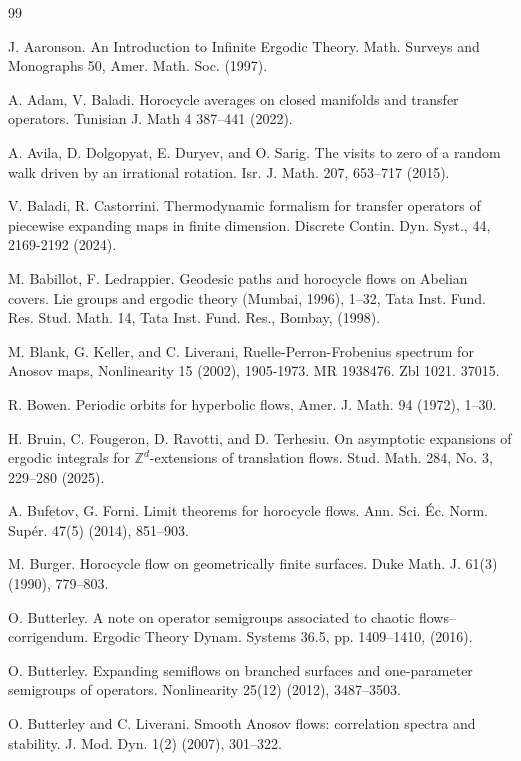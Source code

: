 \documentclass[11pt,letterpaper]{amsart}
\newcommand \Z {{ \mathbb Z}}
\theoremstyle{definition}
\begin{document}


\begin{thebibliography}{99}

 J. Aaronson. An Introduction to Infinite Ergodic Theory. Math. Surveys and Monographs 50,
Amer. Math. Soc. (1997).

 A. Adam, V. Baladi. Horocycle averages on closed manifolds and transfer operators. Tunisian J. Math 4 387--441 (2022).

 A. Avila, D. Dolgopyat, E. Duryev, and O. Sarig. The visits to zero of a random walk driven by an irrational rotation. Isr. J. Math. 207, 653--717 (2015).

 V. Baladi, R. Castorrini. Thermodynamic formalism for transfer operators of piecewise expanding maps in finite dimension. Discrete Contin. Dyn. Syst., 44, 2169-2192 (2024).

 M. Babillot, F. Ledrappier. Geodesic paths and horocycle flows on Abelian covers. Lie
groups and ergodic theory (Mumbai, 1996), 1--32, Tata Inst. Fund. Res. Stud. Math. 14,
Tata Inst. Fund. Res., Bombay, (1998).

 M. Blank, G. Keller, and C. Liverani, Ruelle-Perron-Frobenius spectrum for Anosov maps, Nonlinearity 15 (2002), 1905-1973. MR 1938476. Zbl 1021. 37015.

 R. Bowen. Periodic orbits for hyperbolic flows, Amer. J. Math. 94 (1972), 1--30.

 H. Bruin, C. Fougeron, D. Ravotti, and D. Terhesiu. On asymptotic expansions of ergodic integrals for $\Z^d$-extensions of translation flows. Stud. Math. 284, No. 3, 229--280 (2025).

 A. Bufetov, G. Forni. Limit theorems for horocycle flows. Ann. Sci. \'{E}c. Norm. Sup\'{e}r. 47(5) (2014), 851--903.

 M. Burger. Horocycle flow on geometrically finite surfaces. Duke Math. J. 61(3) (1990), 779--803.

 O. Butterley. A note on operator semigroups associated to chaotic flows--corrigendum. Ergodic Theory Dynam. Systems 36.5, pp. 1409--1410, (2016).

 O. Butterley. Expanding semiflows on branched surfaces and one-parameter semigroups of operators. Nonlinearity 25(12) (2012), 3487--3503.

 O. Butterley and C. Liverani. Smooth Anosov flows: correlation spectra and stability. J. Mod. Dyn. 1(2)
(2007), 301--322.


\end{thebibliography}
\end{document}
